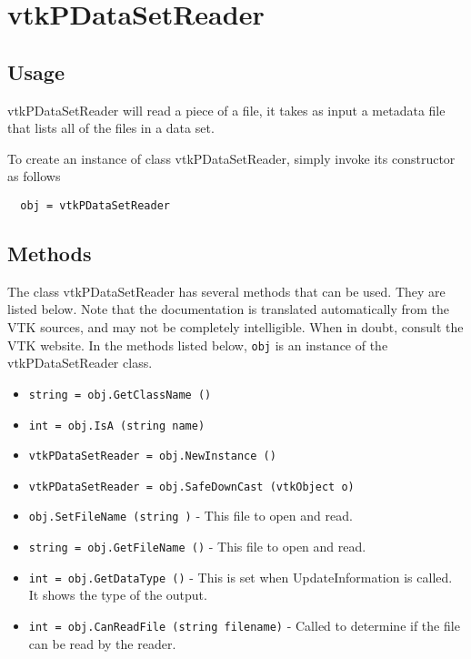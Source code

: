 \section{vtkPDataSetReader}

\subsection{Usage}

 vtkPDataSetReader will read a piece of a file, it takes as input 
 a metadata file that lists all of the files in a data set.

To create an instance of class vtkPDataSetReader, simply
invoke its constructor as follows
\begin{verbatim}
  obj = vtkPDataSetReader
\end{verbatim}
\subsection{Methods}

The class vtkPDataSetReader has several methods that can be used.
  They are listed below.
Note that the documentation is translated automatically from the VTK sources,
and may not be completely intelligible.  When in doubt, consult the VTK website.
In the methods listed below, \verb|obj| is an instance of the vtkPDataSetReader class.
\begin{itemize}
\item  \verb|string = obj.GetClassName ()|

\item  \verb|int = obj.IsA (string name)|

\item  \verb|vtkPDataSetReader = obj.NewInstance ()|

\item  \verb|vtkPDataSetReader = obj.SafeDownCast (vtkObject o)|

\item  \verb|obj.SetFileName (string )| -  This file to open and read.

\item  \verb|string = obj.GetFileName ()| -  This file to open and read.

\item  \verb|int = obj.GetDataType ()| -  This is set when UpdateInformation is called. 
 It shows the type of the output.

\item  \verb|int = obj.CanReadFile (string filename)| -  Called to determine if the file can be read by the reader.

\end{itemize}

